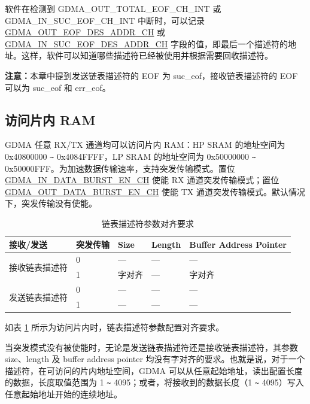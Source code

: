 \documentclass[main\_\_CN.tex]{subfiles}
\begin{document}
软件在检测到 GDMA\_OUT\_TOTAL\_EOF\_CH\_INT 或 GDMA\_IN\_SUC\_EOF\_CH\_INT 中断时，可以记录 \\\hyperref[fielddesc:GDMAOUTEOFDESADDRCHN]{GDMA\_OUT\_EOF\_DES\_ADDR\_CH} 或 \hyperref[fielddesc:GDMAINSUCEOFDESADDRCHN]{GDMA\_IN\_SUC\_EOF\_DES\_ADDR\_CH} 字段的值，即最后一个描述符的地址。这样，软件可以知道哪些描述符已经被使用并根据需要回收描述符。

{\bfseries 注意：}本章中提到发送链表描述符的 EOF 为 suc\_eof，接收链表描述符的 EOF 可以为 suc\_eof 和 err\_eof。

\subsection{访问片内 RAM}\label{sec:dma-access-inter-ram}
GDMA 任意 RX/TX 通道均可以访问片内 RAM：HP SRAM 的地址空间为 0x40800000 \verb+~+ 0x4084FFFF，LP SRAM 的地址空间为 0x50000000 \verb+~+ 0x50000FFF。为加速数据传输速率，支持突发传输模式。置位 \hyperref[fielddesc:GDMAINDATABURSTENCHN]{GDMA\_IN\_DATA\_BURST\_EN\_CH} 使能 RX 通道突发传输模式；置位 \hyperref[fielddesc:GDMAOUTDATABURSTENCHN]{GDMA\_OUT\_DATA\_BURST\_EN\_CH} 使能 TX 通道突发传输模式。默认情况下，突发传输没有使能。

\begin{longtable}[c]{ | l | l | l | l | l | }
    \caption{链表描述符参数对齐要求}
    \label{tab:gdma-inter-desc-param-align}
    \\\hline
    \rowcolor{lightgray}
   \textbf{接收/发送} & \textbf{突发传输} & \textbf{Size} & \textbf{Length} & \textbf{Buffer Address Pointer} \\\hline

    \multirow{2}{*}{接收链表描述符}  & 0  & --- & ---  & --- \\\cline{2-5}
     & 1 & 字对齐   & ---  & 字对齐 \\\hline
    \multirow{2}{*}{发送链表描述符} & 0  & --- & ---  & --- \\\cline{2-5}
     & 1 & --- & ---  & --- \\\hline
\end{longtable}


如表 \ref{tab:gdma-inter-desc-param-align} 所示为访问片内时，链表描述符参数配置对齐要求。

当突发模式没有被使能时，无论是发送链表描述符还是接收链表描述符，其参数 size、length 及 buffer address pointer 均没有字对齐的要求。也就是说，对于一个描述符，在可访问的片内地址空间，GDMA 可以从任意起始地址，读出配置长度的数据，长度取值范围为 1 \verb+~+ 4095；或者，将接收到的数据长度（1 \verb+~+ 4095）写入任意起始地址开始的连续地址。
\end{document}

